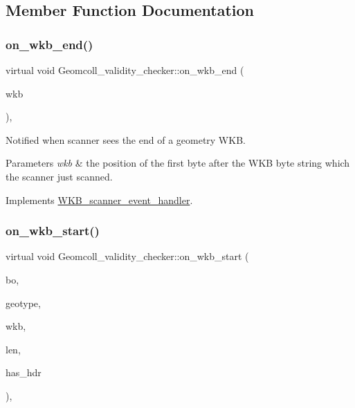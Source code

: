 \subsection{Member Function Documentation}
\mbox{\label{classGeomcoll__validity__checker_ab01b921860de69974b27ba422c55ae82}} 
\subsubsection{\texorpdfstring{on\+\_\+wkb\+\_\+end()}{on\_wkb\_end()}}
{\footnotesize\ttfamily virtual void Geomcoll\+\_\+validity\+\_\+checker\+::on\+\_\+wkb\+\_\+end (\begin{DoxyParamCaption}\item[{const void $\ast$}]{wkb }\end{DoxyParamCaption})\hspace{0.3cm}{\ttfamily [inline]}, {\ttfamily [virtual]}}

Notified when scanner sees the end of a geometry W\+KB. 
\begin{DoxyParams}{Parameters}
{\em wkb} & the position of the first byte after the W\+KB byte string which the scanner just scanned. \\
\hline
\end{DoxyParams}


Implements \mbox{\hyperlink{classWKB__scanner__event__handler_a07c27cceefdd31f25f1d0b3754786b78}{W\+K\+B\+\_\+scanner\+\_\+event\+\_\+handler}}.

\mbox{\label{classGeomcoll__validity__checker_adac22fc99851bc6ef079b7d1ff045abb}} 
\subsubsection{\texorpdfstring{on\+\_\+wkb\+\_\+start()}{on\_wkb\_start()}}
{\footnotesize\ttfamily virtual void Geomcoll\+\_\+validity\+\_\+checker\+::on\+\_\+wkb\+\_\+start (\begin{DoxyParamCaption}\item[{Geometry\+::wkb\+Byte\+Order}]{bo,  }\item[{Geometry\+::wkb\+Type}]{geotype,  }\item[{const void $\ast$}]{wkb,  }\item[{uint32}]{len,  }\item[{bool}]{has\+\_\+hdr }\end{DoxyParamCaption})\hspace{0.3cm}{\ttfamily [inline]}, {\ttfamily [virtual]}}

